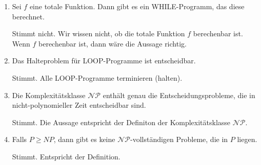 \documentclass{lehramt-informatik-aufgabe}
\begin{document}
\begin{enumerate}

\item Sei $f$ eine totale Funktion. Dann gibt es ein WHILE-Programm, das
diese berechnet.

\begin{liAntwort}
Stimmt nicht. Wir wissen nicht, ob die totale Funktion $f$ berechenbar
ist. Wenn $f$ berechenbar ist, dann wäre die Aussage richtig.
\end{liAntwort}


\item Das Halteproblem für LOOP-Programme ist entscheidbar.

\begin{liAntwort}
Stimmt. Alle LOOP-Programme terminieren (halten).
\end{liAntwort}


\item Die Komplexitätsklasse $\mathcal{NP}$ enthält genau die
Entscheidungsprobleme, die in nicht-polynomieller Zeit entscheidbar
sind.

\begin{liAntwort}
Stimmt. Die Aussage entspricht der Definiton der Komplexitätsklasse
$\mathcal{NP}$.
\end{liAntwort}


\item Falls $P \geq NP$, dann gibt es keine $\mathcal{NP}$-vollständigen
Probleme, die in $P$ liegen.

\begin{liAntwort}
Stimmt. Entspricht der Definition.
\end{liAntwort}
\end{enumerate}
\end{document}
